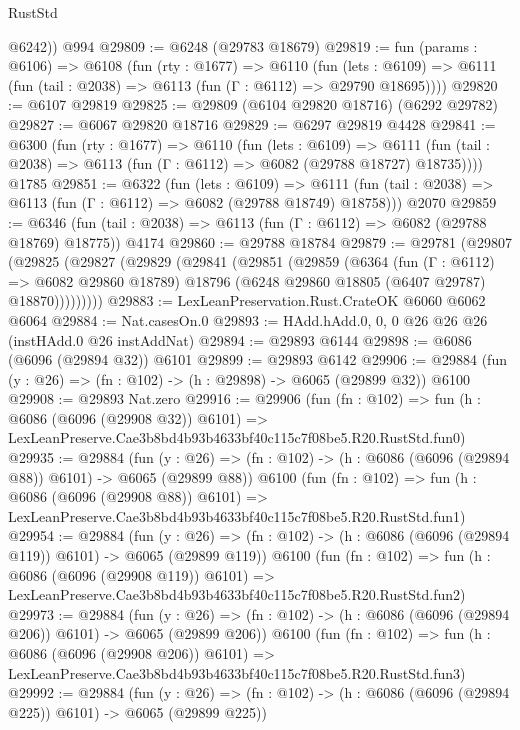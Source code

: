 \begin{lexlean}{RustStd}
\begin{coremodule}
        @6242))
    @994
@29809 := @6248 (@29783 @18679)
@29819 := fun (params : @6106) =>
  @6108
    (fun (rty : @1677) =>
    @6110
      (fun (lets : @6109) =>
      @6111 (fun (tail : @2038) => @6113 (fun (Γ : @6112) => @29790 @18695))))
@29820 := @6107 @29819
@29825 := @29809 (@6104 @29820 @18716) (@6292 @29782)
@29827 := @6067 @29820 @18716
@29829 := @6297 @29819 @4428
@29841 := @6300
    (fun (rty : @1677) =>
    @6110
      (fun (lets : @6109) =>
      @6111 (fun (tail : @2038) => @6113 (fun (Γ : @6112) => @6082 (@29788 @18727) @18735))))
    @1785
@29851 := @6322
    (fun (lets : @6109) =>
    @6111 (fun (tail : @2038) => @6113 (fun (Γ : @6112) => @6082 (@29788 @18749) @18758)))
    @2070
@29859 := @6346
    (fun (tail : @2038) => @6113 (fun (Γ : @6112) => @6082 (@29788 @18769) @18775))
    @4174
@29860 := @29788 @18784
@29879 := @29781
    (@29807
      (@29825
        (@29827
          (@29829
            (@29841
              (@29851
                (@29859
                  (@6364
                    (fun (Γ : @6112) => @6082 @29860 @18789)
                    @18796
                    (@6248 @29860 @18805 (@6407 @29787) @18870)))))))))
@29883 := LexLeanPreservation.Rust.CrateOK @6060 @6062 @6064
@29884 := Nat.casesOn.{0}
@29893 := HAdd.hAdd.{0, 0, 0} @26 @26 @26 (instHAdd.{0} @26 instAddNat)
@29894 := @29893 @6144
@29898 := @6086 (@6096 (@29894 @32)) @6101
@29899 := @29893 @6142
@29906 := @29884 (fun (y : @26) => (fn : @102) -> (h : @29898) -> @6065 (@29899 @32)) @6100
@29908 := @29893 Nat.zero
@29916 := @29906
    (fun (fn : @102) =>
    fun (h : @6086 (@6096 (@29908 @32)) @6101) =>
    LexLeanPreserve.Cae3b8bd4b93b4633bf40c115c7f08be5.R20.RustStd.fun0)
@29935 := @29884
    (fun (y : @26) => (fn : @102) -> (h : @6086 (@6096 (@29894 @88)) @6101) -> @6065 (@29899 @88))
    @6100
    (fun (fn : @102) =>
    fun (h : @6086 (@6096 (@29908 @88)) @6101) =>
    LexLeanPreserve.Cae3b8bd4b93b4633bf40c115c7f08be5.R20.RustStd.fun1)
@29954 := @29884
    (fun (y : @26) => (fn : @102) -> (h : @6086 (@6096 (@29894 @119)) @6101) -> @6065 (@29899 @119))
    @6100
    (fun (fn : @102) =>
    fun (h : @6086 (@6096 (@29908 @119)) @6101) =>
    LexLeanPreserve.Cae3b8bd4b93b4633bf40c115c7f08be5.R20.RustStd.fun2)
@29973 := @29884
    (fun (y : @26) => (fn : @102) -> (h : @6086 (@6096 (@29894 @206)) @6101) -> @6065 (@29899 @206))
    @6100
    (fun (fn : @102) =>
    fun (h : @6086 (@6096 (@29908 @206)) @6101) =>
    LexLeanPreserve.Cae3b8bd4b93b4633bf40c115c7f08be5.R20.RustStd.fun3)
@29992 := @29884
    (fun (y : @26) => (fn : @102) -> (h : @6086 (@6096 (@29894 @225)) @6101) -> @6065 (@29899 @225))

\end{coremodule}
\end{lexlean}
